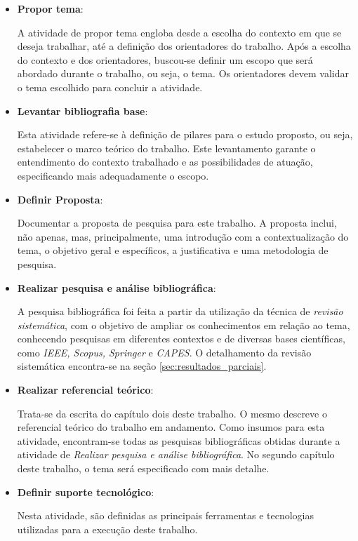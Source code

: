 \begin{itemize}
	\item \textbf{Propor tema}:

		A atividade de propor tema engloba desde a escolha do contexto em que se deseja trabalhar, até a definição dos orientadores do trabalho. Após a escolha do contexto e dos orientadores, buscou-se definir um escopo que será abordado durante o trabalho, ou seja, o tema. Os orientadores devem validar o tema escolhido para concluir a atividade.

	\item \textbf{Levantar bibliografia base}:

		Esta atividade refere-se à definição de pilares para o estudo proposto, ou seja, estabelecer o marco teórico do trabalho. Este levantamento garante o entendimento do contexto trabalhado e as possibilidades de atuação, especificando mais adequadamente o escopo.

	\item \textbf{Definir Proposta}:

		Documentar a proposta de pesquisa para este trabalho. A proposta inclui, não apenas, mas, principalmente, uma introdução com a contextualização do tema, o objetivo geral e específicos, a justificativa e uma metodologia de pesquisa.

	\item \textbf{Realizar pesquisa e análise bibliográfica}:

		A pesquisa bibliográfica foi feita a partir da utilização da técnica de \textit{revisão sistemática}, com o objetivo de ampliar os conhecimentos em relação ao tema, conhecendo pesquisas em diferentes contextos e de diversas bases científicas, como \textit{IEEE, Scopus, Springer} e \textit{CAPES}. O detalhamento da revisão sistemática encontra-se na seção \ref{sec:resultados_parciais}.

	\item \textbf{Realizar referencial teórico}:

		Trata-se da escrita do capítulo dois deste trabalho. O mesmo descreve o referencial teórico do trabalho em andamento. Como insumos para esta atividade, encontram-se todas as pesquisas bibliográficas obtidas durante a atividade de \textit{Realizar pesquisa e análise bibliográfica}. No segundo capítulo deste trabalho, o tema será especificado com mais detalhe.

	\item \textbf{Definir suporte tecnológico}:

		Nesta atividade, são definidas as principais ferramentas e tecnologias utilizadas para a execução deste trabalho. 


\end{itemize}
